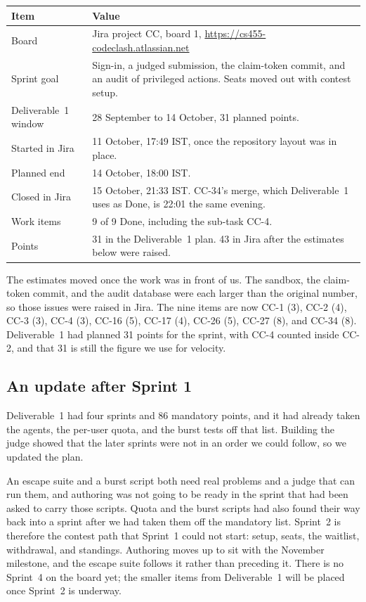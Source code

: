 \documentclass[11pt,a4paper]{article}
\begin{document}
\begin{center}
\small
\begin{tabularx}{\textwidth}{@{}l Y@{}}
\toprule
{} Item & Value \\
\midrule
Board & Jira project CC, board 1, \url{https://cs455-codeclash.atlassian.net} \\
Sprint goal & Sign-in, a judged submission, the claim-token commit, and an audit of privileged actions. Seats moved out with contest setup. \\
Deliverable~1 window & 28 September to 14 October, 31 planned points. \\
Started in Jira & 11 October, 17:49 IST, once the repository layout was in place. \\
Planned end & 14 October, 18:00 IST. \\
Closed in Jira & 15 October, 21:33 IST. CC-34's merge, which Deliverable~1 uses as Done, is 22:01 the same evening. \\
Work items & 9 of 9 Done, including the sub-task CC-4. \\
Points & 31 in the Deliverable~1 plan. 43 in Jira after the estimates below were raised. \\
\bottomrule
\end{tabularx}
\end{center}

The estimates moved once the work was in front of us. The sandbox, the claim-token commit, and the audit database were each larger than the original number, so those issues were raised in Jira. The nine items are now CC-1 (3), CC-2 (4), CC-3 (3), CC-4 (3), CC-16 (5), CC-17 (4), CC-26 (5), CC-27 (8), and CC-34 (8). Deliverable~1 had planned 31 points for the sprint, with CC-4 counted inside CC-2, and that 31 is still the figure we use for velocity.

\subsection{An update after Sprint 1}

Deliverable~1 had four sprints and 86 mandatory points, and it had already taken the agents, the per-user quota, and the burst tests off that list. Building the judge showed that the later sprints were not in an order we could follow, so we updated the plan.

An escape suite and a burst script both need real problems and a judge that can run them, and authoring was not going to be ready in the sprint that had been asked to carry those scripts. Quota and the burst scripts had also found their way back into a sprint after we had taken them off the mandatory list. Sprint~2 is therefore the contest path that Sprint~1 could not start: setup, seats, the waitlist, withdrawal, and standings. Authoring moves up to sit with the November milestone, and the escape suite follows it rather than preceding it. There is no Sprint~4 on the board yet; the smaller items from Deliverable~1 will be placed once Sprint~2 is underway.
\end{document}

